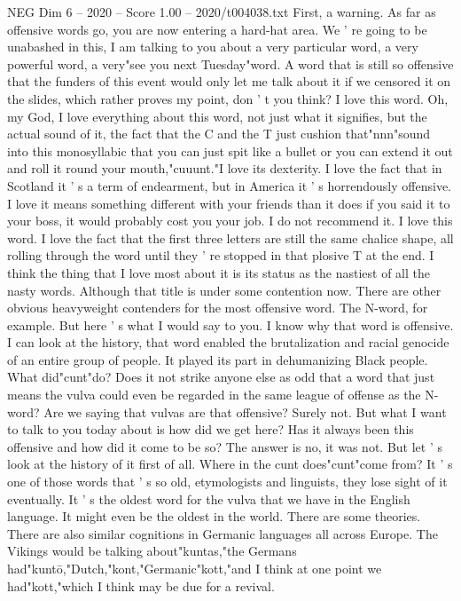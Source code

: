 \begin{textsample}{NEG Dim 6 – 2020 – Score 1.00 – 2020/t004038.txt}  \label{ex:f6_neg_026}
First, a warning.
As far as offensive words go, you are now entering a hard-hat area.
We ' re going to be unabashed in this, I am talking to you about a very particular word, a very powerful word, a very"see you next Tuesday"word.
A word that is still so offensive that the funders of this event would only let me talk about it if we censored it on the slides, which rather proves my point, don ' t you think?
I love this word.
Oh, my God, I love everything about this word, not just what it signifies, but the actual sound of it, the fact that the C and the T just cushion that"nnn"sound into this monosyllabic that you can just spit like a bullet or you can extend it out and roll it round your mouth,"cuuunt."I love its dexterity.
I love the fact that in Scotland it ' s a term of endearment, but in America it ' s horrendously offensive.
I love it means something different with your friends than it does if you said it to your boss, it would probably cost you your job.
I do not recommend it.
I love this word.
I love the fact that the first three letters are still the same chalice shape, all rolling through the word until they ' re stopped in that plosive T at the end.
I think the thing that I love most about it is its status as the nastiest of all the nasty words.
Although that title is under some contention now.
There are other obvious heavyweight contenders for the most offensive word.
The N-word, for example.
But here ' s what I would say to you.
I know why that word is offensive.
I can look at the history, that word enabled the brutalization and racial genocide of an entire group of people.
It played its part in dehumanizing Black people.
What did"cunt"do?
Does it not strike anyone else as odd that a word that just means the vulva could even be regarded in the same league of offense as the N-word?
Are we saying that vulvas are that offensive?
Surely not.
But what I want to talk to you today about is how did we get here?
Has it always been this offensive and how did it come to be so?
The answer is no, it was not.
But let ' s look at the history of it first of all.
Where in the cunt does"cunt"come from?
It ' s one of those words that ' s so old, etymologists and linguists, they lose sight of it eventually.
It ' s the oldest word for the vulva that we have in the English language.
It might even be the oldest in the world.
There are some theories.
There are also similar cognitions in Germanic languages all across Europe.
The Vikings would be talking about"kuntas,"the Germans had"kuntō,"Dutch,"kont,"Germanic"kott,"and I think at one point we had"kott,"which I think may be due for a revival.

\end{textsample}
